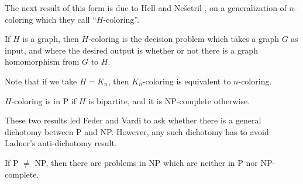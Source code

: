 The next result of this form is due to Hell and Ne\v{s}etril \cite{h-coloring}, on a generalization of $n$-coloring which they call ``$H$-coloring''.

\begin{defn} If $H$ is a graph, then $H$-coloring is the decision problem which takes a graph $G$ as input, and where the desired output is whether or not there is a graph homomorphism from $G$ to $H$.
\end{defn}

Note that if we take $H = K_n$, then $K_n$-coloring is equivalent to $n$-coloring.

\begin{thm} $H$-coloring is in P if $H$ is bipartite, and it is NP-complete otherwise.
\end{thm}

These two results led Feder and Vardi \cite{feder-vardi} to ask whether there is a general dichotomy between P and NP. However, any such dichotomy has to avoid Ladner's \cite{ladner} anti-dichotomy result.

\begin{thm} If P $\ne$ NP, then there are problems in NP which are neither in P nor NP-complete.
\end{thm}

